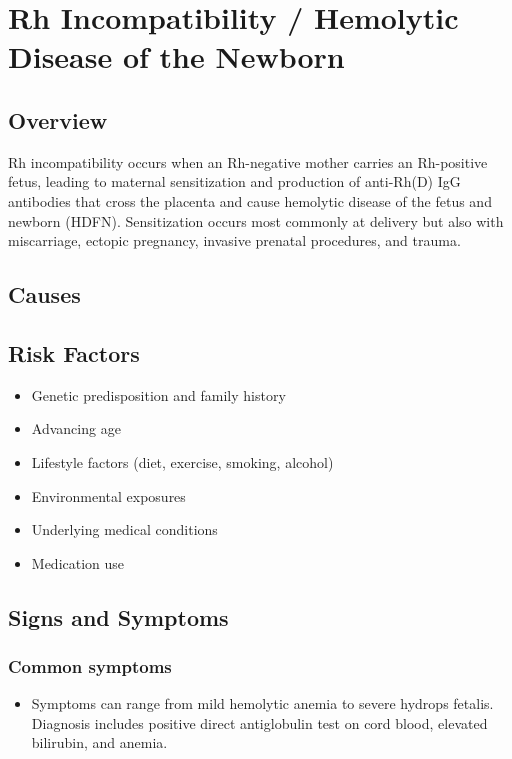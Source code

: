\chapter{Rh Incompatibility / Hemolytic Disease of the Newborn}
\label{sec:Rh Incompatibility}

\section{Overview}
Rh incompatibility occurs when an Rh-negative mother carries an Rh-positive fetus, leading to maternal sensitization and production of anti-Rh(D) IgG antibodies that cross the placenta and cause hemolytic disease of the fetus and newborn (HDFN). Sensitization occurs most commonly at delivery but also with miscarriage, ectopic pregnancy, invasive prenatal procedures, and trauma.
\section{Causes}
\section{Risk Factors}

\begin{itemize}[noitemsep]
  \item Genetic predisposition and family history
  \item Advancing age
  \item Lifestyle factors (diet, exercise, smoking, alcohol)
  \item Environmental exposures
  \item Underlying medical conditions
  \item Medication use
\end{itemize}
\section{Signs and Symptoms}

\subsection{Common symptoms}
\begin{itemize}[noitemsep]
  \item Symptoms can range from mild hemolytic anemia to severe hydrops fetalis. Diagnosis includes positive direct antiglobulin test on cord blood, elevated bilirubin, and anemia. 
  \end{itemize}

